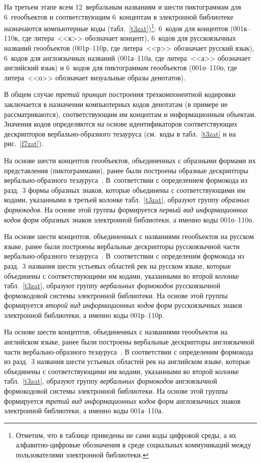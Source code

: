 \begin{multicols}{2}
   На третьем этапе всем 12~вербальным названиям и шести пиктограммам для 6~геообъектов 
   и соответствующим 6~концептам в электронной библиотеке назначаются 
компьютерные коды (табл.~\ref{t3zat})\footnote{Отметим, что в таблице приведены не сами коды цифровой среды, а их 
алфавитно-цифровые обозначения в среде социальных коммуникаций между пользователями электронной 
библиотеки.}: 6~кодов для концептов (001к--110к, где литера~<<к>> 
обозначает концепт), 6~кодов для русскоязычных названий геообъектов (001р--110р, где 
литера~<<р>> обозначает русский язык), 6~кодов для англоязычных названий (001а--110а, 
где литера~<<а>> обозначает английский язык) и 6~кодов для пиктограммам гео\-объек\-тов 
(001о--110о, где литера~<<о>> обозначает визуальные образы денотатов).
   
   В общем случае \textit{третий принцип} построения трехкомпонентной кодировки 
заключается в назначении компьютерных кодов денотатам (в примере не рассматриваются), 
соответствующим им концептам и информационным объектам. Значения кодов 
определяются на основе идентификаторов соответствующих дескрипторов 
   вербально-образного тезауруса (см.\ коды в табл.~\ref{t3zat} и на рис.~\ref{f7zat}).
 
 
   На основе шести концептов геообъектов, объединенных с образными формами их 
пред\-став\-ле\-ния (пиктограммами), ранее были построены образные дескрипторы 
   вербально-образного тезауруса~\cite{38zat}. В~соответствии с определением 
формокода из разд.~3 формы образных знаков, которые объединены с соответствующими им 
кодами, указанными в третьей колонке табл.~\ref{t3zat}, образуют группу \textit{образных 
формокодов}. На основе этой группы формируется \textit{первый вид информационных 
кодов} форм образных знаков электронной библиотеки, а именно коды 001о--110о.
   
   На основе шести концептов, объединенных с названиями геообъектов на русском языке, 
ранее были построены вербальные дескрипторы русскоязычной части вербально-образного 
тезауруса~\cite{38zat}. В~соответствии с определеним формокода из разд.~3 названия 
шести устьевых областей рек на русском языке, которые объединены с соответствующими 
им кодами, указанными во второй колонке табл.~\ref{t3zat}, образуют группу 
\textit{вербальных формокодов} русскоязычной формокодовой системы электронной 
биб\-лио\-те\-ки. На основе этой группы формируется \textit{второй вид информационных кодов} 
форм русскоязычных знаков электронной библиотеки, а именно коды 001р--110р.
   
   На основе шести концептов, объединенных с названиями геообъектов на английском 
языке, ранее были построены вербальные дескрипторы англоязычной части 
   вербально-образного тезауруса~\cite{38zat}. В соответствии с определеним 
формокода из разд.~3 названия шести устьевых областей рек на английском языке, которые 
объединены с соответствующими им кодами, указанными во второй колонке 
табл.~\ref{t3zat}, образуют группу \textit{вербальных формокодов} англоязычной 
формокодовой системы электронной библиотеки. На основе этой группы формируется 
\textit{третий вид информационных кодов} форм англоязычных знаков электронной 
библиотеки, а именно коды 001а--110а.
   

\end{multicols}
